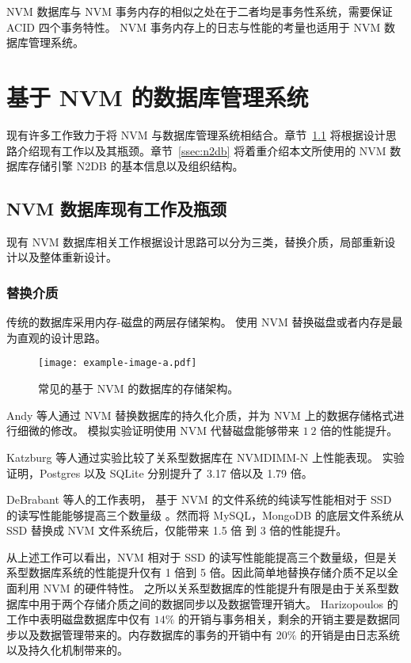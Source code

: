 NVM 数据库与 NVM 事务内存的相似之处在于二者均是事务性系统，需要保证 ACID 四个事务特性。
NVM 事务内存上的日志与性能的考量也适用于 NVM 数据库管理系统。

\section{基于 NVM 的数据库管理系统}

现有许多工作致力于将 NVM 与数据库管理系统相结合。章节~\ref{ssec:nvmdb} 将根据设计思路介绍现有工作以及其瓶颈。章节~\ref{ssec:n2db} 将着重介绍本文所使用的 NVM 数据库存储引擎 N2DB 的基本信息以及组织结构。

\subsection{NVM 数据库现有工作及瓶颈}
\label{ssec:nvmdb}

现有 NVM 数据库相关工作根据设计思路可以分为三类，替换介质，局部重新设计以及整体重新设计。

\subsubsection{替换介质}

传统的数据库采用内存-磁盘的两层存储架构。
使用 NVM 替换磁盘或者内存是最为直观的设计思路。

\begin{figure}
    \centering
    \texttt{[image: example-image-a.pdf]}
    \caption{常见的基于 NVM 的数据库的存储架构。}
    \label{fig:nvm-structure}
\end{figure}

Andy 等人通过 NVM 替换数据库的持久化介质，并为 NVM 上的数据存储格式进行细微的修改\cite{arulraj_lets_2015}。
模拟实验证明使用 NVM 代替磁盘能够带来 $1~2$ 倍的性能提升。

Katzburg 等人通过实验比较了关系型数据库在 NVMDIMM-N 上性能表现\cite{katzburg_nvdimm-n_2018}。
实验证明，Postgres 以及 SQLite 分别提升了 3.17 倍以及 1.79 倍。

DeBrabant 等人的工作表明，
基于 NVM 的文件系统的纯读写性能相对于 SSD 的读写性能能够提高三个数量级
\cite{debrabant_prolegomenon_2014}。然而将 MySQL，MongoDB 的底层文件系统从 SSD 替换成 NVM 文件系统后，仅能带来 1.5 倍 到 3 倍的性能提升。

从上述工作可以看出，NVM 相对于 SSD 的读写性能能提高三个数量级，但是关系型数据库系统的性能提升仅有 1 倍到 5 倍。因此简单地替换存储介质不足以全面利用 NVM 的硬件特性。
之所以关系型数据库的性能提升有限是由于关系型数据库中用于两个存储介质之间的数据同步以及数据管理开销大。
Harizopoulos 的工作中表明磁盘数据库中仅有 $14\%$ 的开销与事务相关，剩余的开销主要是数据同步以及数据管理带来的\cite{harizopoulos_oltp_2018}。内存数据库的事务的开销中有 $20\%$ 的开销是由日志系统以及持久化机制带来的。


